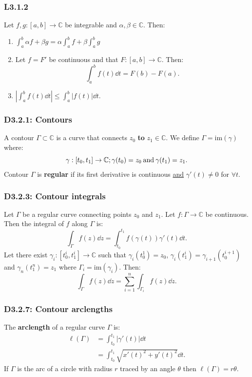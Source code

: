\documentclass{article}
\begin{document}
\begin{multicols*}{3}
\subsubsection*{L3.1.2}
Let $f,g:[a,b]\rightarrow\mathbb{C}$ be integrable
and $\alpha,\beta\in\mathbb{C}$. Then:
\begin{enumerate}
    \item $\displaystyle\int_{a}^{b}\alpha f+\beta g
    =\alpha\int_{a}^{b}f+\beta\int_{a}^{b}g$

    \item Let $f=F'$ be continuous and that
    $F:[a,b]\rightarrow\mathbb{C}$. Then:
    $$\int_{a}^{b}f(t)\dd t=F(b)-F(a).$$

    \item $\displaystyle\left|\int_{a}^{b}f(t)\dd t\right|
    \leq\int_{a}^{b}|f(t)|\dd t$.
\end{enumerate}

\subsubsection*{D3.2.1: Contours}
A contour $\Gamma\subset\mathbb{C}$ is a curve that
connects $z_0$ \textbf{to} $z_1\in\mathbb{C}$.
We define $\Gamma=\text{im}(\gamma)$ where:
$$\gamma:[t_0,t_1]\rightarrow\mathbb{C};
\gamma(t_0)=z_0\hspace{0.03in}
\text{and}\hspace{0.03in}\gamma(t_1)=z_1.$$
Contour $\Gamma$ is \textbf{regular} if its first derivative
is continuous \underline{and} $\gamma'(t)\neq0$ for $\forall t$.

\subsubsection*{D3.2.3: Contour integrals}
Let $\Gamma$ be a regular curve connecting points $z_0$ and $z_1$.
Let $f:\Gamma\rightarrow\mathbb{C}$ be continuous. Then the integral
of $f$ along $\Gamma$ is:
$$\int_{\Gamma}f(z)\dd z=\int_{t_0}^{t_1}f(\gamma(t))\gamma'(t)\dd t.$$
Let there exist $\gamma_i:[t_0^i,t_1^i]\rightarrow\mathbb{C}$ such that
$\gamma_i(t_0^1)=z_0$, $\gamma_i(t_1^i)=\gamma_{i+1}(t_0^{i+1})$ and
$\gamma_n(t_1^n)=z_1$ where $\Gamma_i=\text{im}(\gamma_i)$. Then:
$$\int_{\Gamma}f(z)\dd z=\sum_{i=1}^{n}\int_{\Gamma_i}f(z)\dd z.$$

\subsubsection*{D3.2.7: Contour arclengths}
The \textbf{arclength} of a regular curve $\Gamma$ is:
\begin{align*}
    \ell(\Gamma)
    &=\int_{t_0}^{t_1}|\gamma'(t)|\dd t \\
    &=\int_{t_0}^{t_1}\sqrt{x'(t)^2+y'(t)^2}\dd t.
\end{align*}
If $\Gamma$ is the arc of a circle with radius $r$ traced
by an angle $\theta$ then $\ell(\Gamma)=r\theta$.


\end{multicols*}
\end{document}
